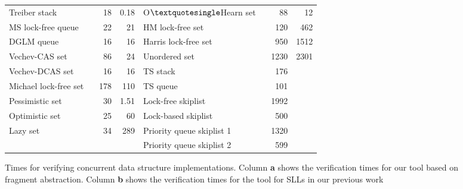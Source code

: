 \begin{figure}[]
\begin{tabular}{|l | r| r | l | r | r |}


\textsf{Treiber stack  ~\cite{Treiber:stack}} & \textsf {18} & \textsf {0.18} & \textsf {O$\textquotesingle $Hearn set  ~\cite{OHearnlist}} & \textsf{88} & \textsf{12} \\
\textsf{MS lock-free queue  ~\cite{MS:QueueAlgorithms}}& \textsf{22} & \textsf {21} & \textsf{HM lock-free set  ~\cite{ArtOfMpP} } & \textsf{120} & \textsf{462} \\
\textsf{DGLM queue  ~\cite{Doherty:lockfree}}&  \textsf {16} & \textsf{16} & \textsf{Harris lock-free set  ~\cite{Harris:list}} & \textsf{950} & \textsf {1512} \\
\textsf{Vechev-CAS set  ~\cite{Vechev:list}}  & \textsf{86} & \textsf {24} & \textsf{Unordered set  ~\cite{Zhang:unorderedlist}} & \textsf{1230} & \textsf {2301} \\
\cline{4-5}
\textsf{Vechev-DCAS set  ~\cite{Vechev:list}}   & \textsf{16} & \textsf{16} & \textsf{TS stack  ~\cite{ts-stack}}  & \textsf{176} &\\
\textsf{Michael lock-free set ~\cite{Michael:list}}  & \textsf{178} & \textsf{110} & \textsf{TS queue  ~\cite{ts-stack}} & \textsf{101} &\\
\cline{4-5}
\textsf{Pessimistic set  ~\cite{ArtOfMpP}}&\textsf{30} & \textsf{1.51} & \textsf{Lock-free skiplist   ~\cite{ArtOfMpP}}& \textsf{1992} & \\
\textsf{Optimistic set ~\cite{ArtOfMpP}}& \textsf{25} & \textsf{60} & \textsf{Lock-based skiplist ~\cite{lockskiplist}}& \textsf{500} & \\
\textsf{Lazy set ~\cite{Lazyset}}  & \textsf {34} & \textsf{289} & \textsf{Priority queue skiplist 1 ~\cite{Shavit:queue}} &\textsf{1320} & \\
& & &\textsf{Priority queue skiplist 2~\cite{Linden:opodis13}}  &  \textsf{599} &\\
\hline
\end{tabular}

\caption{Times for verifying concurrent data structure implementations.
Column {\bf a} shows the verification times for our tool based on fragment abstraction.
Column {\bf b} shows the verification times for the tool for SLLs in our previous
work~\protect\cite{Quy:sas16}}
\label{Experiments:fig}
\vspace*{-0.6cm}
\end{figure}
